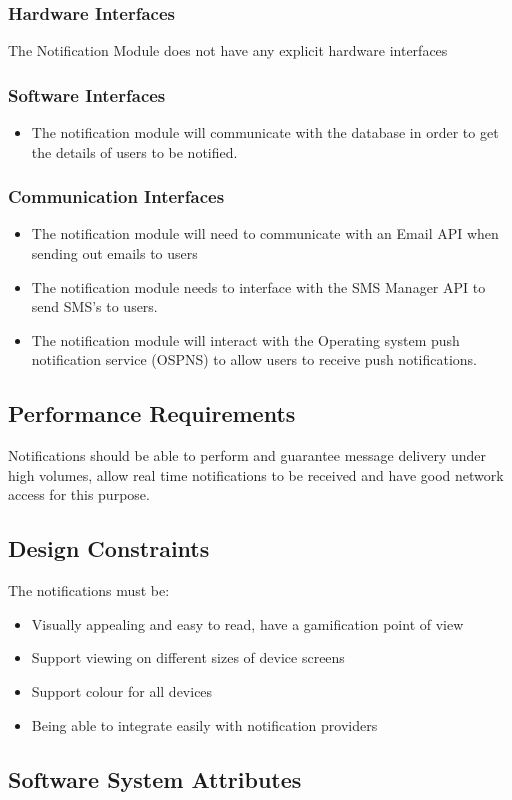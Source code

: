 \subsubsection{Hardware Interfaces}
The Notification Module does not have any explicit hardware interfaces

\subsubsection{Software Interfaces}
  \begin{itemize}
  	\item The notification module will communicate with the database in order to get the details of users to be notified.
  \end{itemize}
  
\subsubsection{Communication Interfaces}
	\begin{itemize}
		\item The notification module will need to communicate with an Email API when sending out emails to users
		\item The notification module needs to interface with the SMS Manager API to send SMS's to users.
		\item The notification module will interact with the Operating system push notification service (OSPNS) to allow users to receive push notifications.
	\end{itemize}
	
\subsection{Performance Requirements}
Notifications should be able to perform and guarantee message delivery under high volumes, allow real time notifications to be received and have good network access for this purpose. 

\subsection{Design Constraints}
The notifications must be:
\begin{itemize}
	\item Visually appealing and easy to read, have a gamification point of view
	\item Support viewing on different sizes of device screens
	\item Support colour for all devices
	\item Being able to integrate easily with notification providers
\end{itemize}


\subsection{Software System Attributes}

